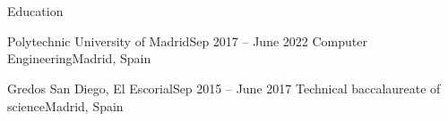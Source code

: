 \section{\faGraduationCap}{Education}

\resumeEntryStart

\resumeEntryTSDL
{Polytechnic University of Madrid}{Sep 2017 -- June 2022}
{Computer Engineering}{Madrid, Spain}

\resumeEntryTSDL
{Gredos San Diego, El Escorial}{Sep 2015 -- June 2017}
{Technical baccalaureate of science}{Madrid, Spain}

\resumeEntryEnd

